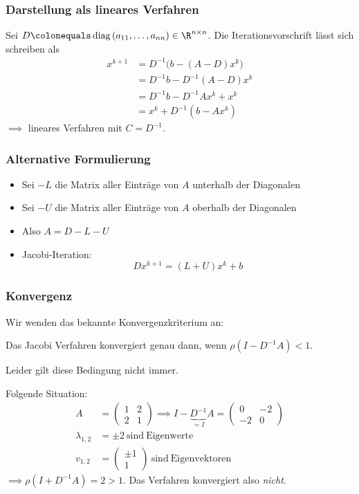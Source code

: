 \subsubsection{Darstellung als lineares Verfahren}
Sei $D\colonequals\operatorname{diag} \left(a_{11},\ldots,a_{nn} \right) \in \R^{n \times n}$.
Die Iterationsvorschrift lässt sich schreiben als
\begin{align*}
    x^{k+1} & =D^{-1} \big(b-(A-D)x^k \big) \\
    & = D^{-1}b-D^{-1} (A-D) x^k \\
    & = D^{-1}b-D^{-1}Ax^k+x^k \\
    & = x^k+D^{-1} (b-Ax^k)
\end{align*}
$\implies$ lineares Verfahren mit $C=D^{-1}$.

\subsubsection{Alternative Formulierung}
\begin{itemize}
    \item Sei $-L$ die Matrix aller Einträge von $A$ unterhalb der Diagonalen
    \item Sei $-U$ die Matrix aller Einträge von $A$ oberhalb der Diagonalen
    \item Also $A=D-L-U$
    \item Jacobi-Iteration: \begin{equation*}
            Dx^{k+1}=(L+U)x^k+b
        \end{equation*}
\end{itemize}

\subsubsection{Konvergenz}

Wir wenden das bekannte Konvergenzkriterium an:
\begin{satz}
Das Jacobi Verfahren konvergiert genau dann, wenn $\rho \left(I-D^{-1}A \right) <1$.
\end{satz}
Leider gilt diese Bedingung nicht immer.
\begin{bsp}
Folgende Situation:
\begin{align*}
 A & = \begin{pmatrix}
    1 & 2 \\
    2 & 1
\end{pmatrix} \implies I-\underbrace{D^{-1}}_{=I}A = \begin{pmatrix}
    0 & -2 \\
    -2 & 0
\end{pmatrix} \\
	\lambda_{1,2} & =\pm 2\ \mathrm{sind\ Eigenwerte} \\
	v_{1,2} & = \begin{pmatrix}
		\pm 1 \\
		1
	\end{pmatrix}\ \mathrm{sind\ Eigenvektoren}
\end{align*}
$\implies \rho\left(I+D^{-1}A\right) =2>1$. Das Verfahren konvergiert also \emph{nicht}.
\end{bsp}

